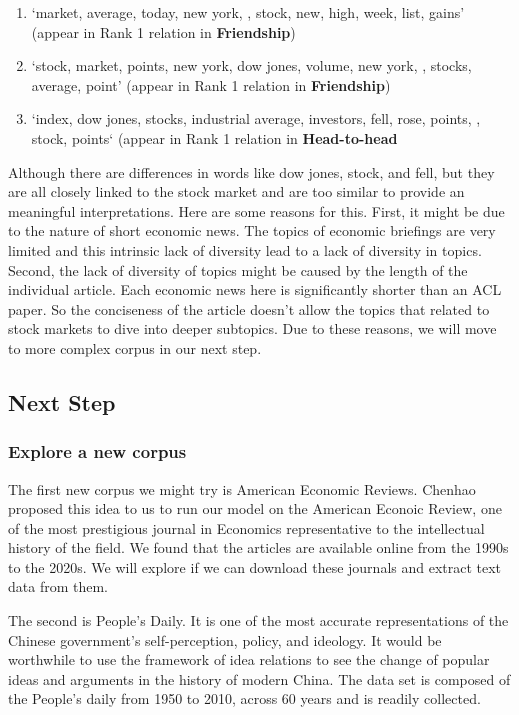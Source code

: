 \documentclass[11pt,a4paper]{article}
\newcommand\boldfriend[1]{\textcolor{green(html/cssgreen)}{\textbf{#1}}}
\newcommand\boldhead[1]{\textcolor{red-brown}{\textbf{#1}}}
\begin{document}
\begin{enumerate}
    \item `market, average, today, new york, , stock, new, high, week, list, gains' (appear in Rank 1 relation in \boldfriend{Friendship})
    \item `stock, market, points, new york, dow jones, volume, new york, , stocks, average, point' (appear in Rank 1 relation in \boldfriend{Friendship})
    \item `index, dow jones, stocks, industrial average, investors, fell, rose, points, , stock, points` (appear in Rank 1 relation in \boldhead{Head-to-head}
\end{enumerate}

Although there are differences in words like dow jones, stock, and fell, but they are all closely linked to the stock market and are too similar to provide an meaningful interpretations. Here are some reasons for this. 
First, it might be due to the nature of short economic news. The topics of economic briefings are very limited and this intrinsic lack of diversity lead to a lack of diversity in topics. Second, the lack of diversity of topics might be caused by the length of the individual article. Each economic news here is significantly shorter than an ACL paper. So the conciseness of the article doesn't allow the topics that related to stock markets to dive into deeper subtopics. Due to these reasons, we will move to more complex corpus in our next step.

\subsection{Next Step}
\subsubsection{Explore a new corpus}

The first new corpus we might try is American Economic Reviews. Chenhao proposed this idea to us to run our model on the American Econoic Review, one of the most prestigious journal in Economics representative to the intellectual history of the field. We found that the articles are available online from the 1990s to the 2020s. We will explore if we can download these journals and extract text data from them. 

The second is People’s Daily. It is one of the most accurate representations of the Chinese government’s self-perception, policy, and ideology. It would be worthwhile to use the framework of idea relations to see the change of popular ideas and arguments in the history of modern China. The data set is composed of the People’s daily from 1950 to 2010, across 60 years and is readily collected.
\end{document}
